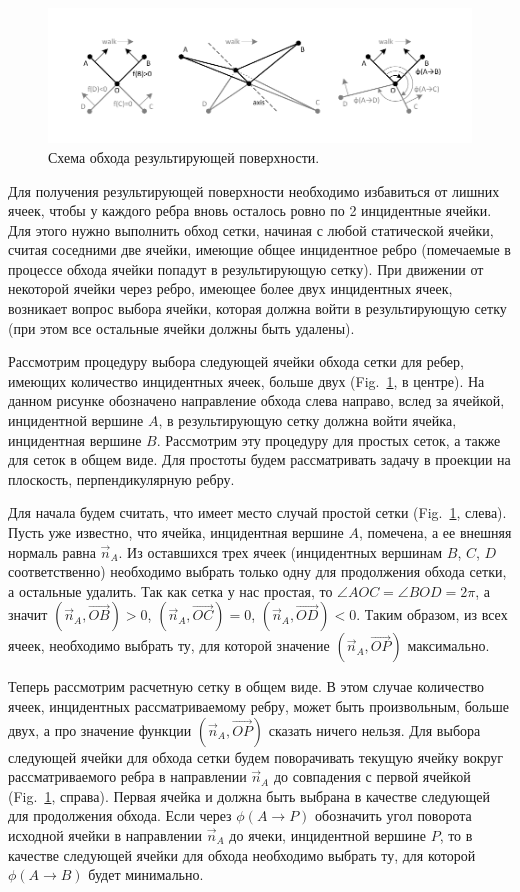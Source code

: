 \begin{figure}[h]
\includegraphics[width=1.0\textwidth]{pics/pic_walk_1_size.pdf}
\caption{Схема обхода результирующей поверхности.}\label{fig:pic_walk}
\end{figure}

Для получения результирующей поверхности необходимо избавиться от лишних ячеек, чтобы у каждого ребра вновь осталось ровно по 2 инцидентные ячейки.
Для этого нужно выполнить обход сетки, начиная с любой статической ячейки, считая соседними две ячейки, имеющие общее инцидентное ребро (помечаемые в процессе обхода ячейки попадут в результирующую сетку).
При движении от некоторой ячейки через ребро, имеющее более двух инцидентных ячеек, возникает вопрос выбора ячейки, которая должна войти в результирующую сетку (при этом все остальные ячейки должны быть удалены).

Рассмотрим процедуру выбора следующей ячейки обхода сетки для ребер, имеющих количество инцидентных ячеек, больше двух (Fig.~\ref{fig:pic_walk}, в центре).
На данном рисунке обозначено направление обхода слева направо, вслед за ячейкой, инцидентной вершине $A$, в результирующую сетку должна войти ячейка, инцидентная вершине $B$.
Рассмотрим эту процедуру для простых сеток, а также для сеток в общем виде.
Для простоты будем рассматривать задачу в проекции на плоскость, перпендикулярную ребру.

Для начала будем считать, что имеет место случай простой сетки (Fig.~\ref{fig:pic_walk}, слева).
Пусть уже известно, что ячейка, инцидентная вершине $A$, помечена, а ее внешняя нормаль равна $\vec{n}_A$.
Из оставшихся трех ячеек (инцидентных вершинам $B$, $C$, $D$ соответственно) необходимо выбрать только одну для продолжения обхода сетки, а остальные удалить.
Так как сетка у нас простая, то $\angle AOC = \angle BOD = 2 \pi$, а значит $(\vec{n}_A, \vec{OB}) > 0$, $(\vec{n}_A, \vec{OC}) = 0$, $(\vec{n}_A, \vec{OD}) < 0$.
Таким образом, из всех ячеек, необходимо выбрать ту, для которой значение $(\vec{n}_A, \vec{OP})$ максимально.

Теперь рассмотрим расчетную сетку в общем виде.
В этом случае количество ячеек, инцидентных рассматриваемому ребру, может быть произвольным, больше двух, а про значение функции $(\vec{n}_A, \vec{OP})$ сказать ничего нельзя.
Для выбора следующей ячейки для обхода сетки будем поворачивать текущую ячейку вокруг рассматриваемого ребра в направлении $\vec{n}_A$ до совпадения с первой ячейкой (Fig.~\ref{fig:pic_walk}, справа).
Первая ячейка и должна быть выбрана в качестве следующей для продолжения обхода.
Если через $\phi(A \rightarrow P)$  обозначить угол поворота исходной ячейки в направлении $\vec{n}_A$ до ячеки, инцидентной вершине $P$, то в качестве следующей ячейки для обхода необходимо выбрать ту, для которой $\phi(A \rightarrow B)$ будет минимально.

